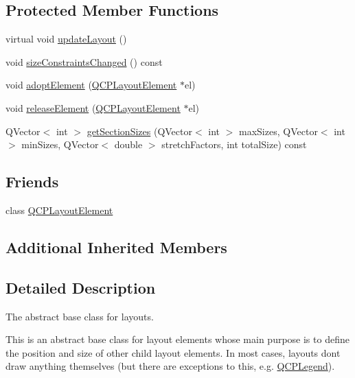 \subsection*{Protected Member Functions}
\begin{DoxyCompactItemize}
\item 
virtual void \hyperlink{class_q_c_p_layout_a165c77f6287ac92e8d03017ad913378b}{update\+Layout} ()
\item 
void \hyperlink{class_q_c_p_layout_a6218cd7e5c0e30077c1aeaffe55b6145}{size\+Constraints\+Changed} () const 
\item 
void \hyperlink{class_q_c_p_layout_af6dbbc24156a808da29cd1ec031729a3}{adopt\+Element} (\hyperlink{class_q_c_p_layout_element}{Q\+C\+P\+Layout\+Element} $\ast$el)
\item 
void \hyperlink{class_q_c_p_layout_a4afbb4bef0071f72f91afdac4433a18e}{release\+Element} (\hyperlink{class_q_c_p_layout_element}{Q\+C\+P\+Layout\+Element} $\ast$el)
\item 
Q\+Vector$<$ int $>$ \hyperlink{class_q_c_p_layout_a92d9dcd95e9510b323706ef7fc4ff62e}{get\+Section\+Sizes} (Q\+Vector$<$ int $>$ max\+Sizes, Q\+Vector$<$ int $>$ min\+Sizes, Q\+Vector$<$ double $>$ stretch\+Factors, int total\+Size) const 
\end{DoxyCompactItemize}
\subsection*{Friends}
\begin{DoxyCompactItemize}
\item 
class \hyperlink{class_q_c_p_layout_a0790750c7e7f14fdbd960d172655b42b}{Q\+C\+P\+Layout\+Element}
\end{DoxyCompactItemize}
\subsection*{Additional Inherited Members}


\subsection{Detailed Description}
The abstract base class for layouts. 

This is an abstract base class for layout elements whose main purpose is to define the position and size of other child layout elements. In most cases, layouts don\textquotesingle{}t draw anything themselves (but there are exceptions to this, e.\+g. \hyperlink{class_q_c_p_legend}{Q\+C\+P\+Legend}).

